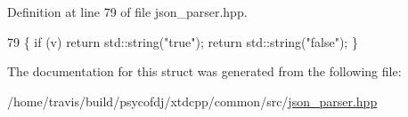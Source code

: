 Definition at line 79 of file json\-\_\-parser.\-hpp.


\begin{DoxyCode}
79 \{ \textcolor{keywordflow}{if} (v) \textcolor{keywordflow}{return} std::string(\textcolor{stringliteral}{"true"}); \textcolor{keywordflow}{return} std::string(\textcolor{stringliteral}{"false"}); \}
\end{DoxyCode}


The documentation for this struct was generated from the following file\-:\begin{DoxyCompactItemize}
\item 
/home/travis/build/psycofdj/xtdcpp/common/src/\hyperlink{json__parser_8hpp}{json\-\_\-parser.\-hpp}\end{DoxyCompactItemize}
